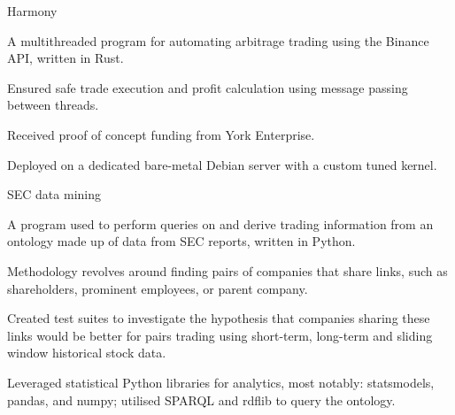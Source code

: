 
\begin{cventries}
  \cventry
    {} %
    {Harmony} %
    {} %
    {} %
    {
      \begin{cvitems} %
        \item {A multithreaded program for automating arbitrage trading using the Binance API, written in Rust.}
        \vspace{0.5mm}
		\item {Ensured safe trade execution and profit calculation using message passing between threads.}
		\vspace{0.5mm}
		\item {Received proof of concept funding from York Enterprise.}
		\vspace{0.5mm}
		\item {Deployed on a dedicated bare-metal Debian server with a custom tuned kernel.}
      \end{cvitems}
    }

\begin{comment}
  \cventry
    {}
    {Advantage}
    {}
    {}
    {
      \begin{cvitems}
        \item {A utility for automating options trading written in Python.}
        \vspace{0.5mm}
		\item {Options strategy automaton script that places trades, based on economic indicators, through the Interactive Brokers API.}
		\vspace{0.5mm}
		\item {Heavily utilises statistical Python libraries, most notably: statsmodels, pandas, and numpy.}
      \end{cvitems}
    }
\end{comment}
    
    \cventry
    {}
    {SEC data mining}
    {}
    {}
    {
      \begin{cvitems}
        \item {A program used to perform queries on and derive trading information from an ontology made up of data from SEC reports, written in Python.}
        \vspace{0.5mm}
		\item {Methodology revolves around finding pairs of companies that share links, such as shareholders, prominent employees, or parent company.}
		\vspace{0.5mm}
		\item {Created test suites to investigate the hypothesis that companies sharing these links would be better for pairs trading using short-term, long-term and sliding window historical stock data.}
		\vspace{0.5mm}
		\item {Leveraged statistical Python libraries for analytics, most notably: statsmodels, pandas, and numpy; utilised SPARQL and rdflib to query the ontology.}
      \end{cvitems}
    }
\end{cventries}